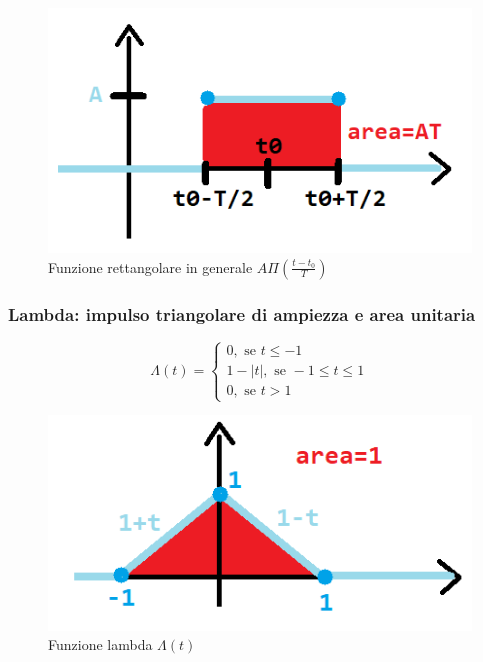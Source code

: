 	\begin{figure}[h]
		\centering
		\includegraphics[scale=0.5]{immagini/rettangoloGenerale}
		\caption{ Funzione rettangolare in generale $ A \varPi( \frac{t-t_0}{T}) $ }
		\label{fig: rettangoloGenerale}
	\end{figure}


\subsubsection{Lambda: impulso triangolare di ampiezza e area unitaria}
	
	\begin{equation*}
	\varLambda(t)=
	\begin{cases} 
	0, \mbox{ se } t \leq -1\\ 
	1-|t|, \mbox{ se } -1 \leq t \leq 1\\ 
	0, \mbox{ se }  t > 1
	\end{cases} 
	\end{equation*}
	
	\begin{figure}[h]
		\centering
		\includegraphics[scale=0.5]{immagini/lambda}
		\caption{ Funzione lambda $ \varLambda(t) $ }
		\label{fig: lambda}
	\end{figure}
	
